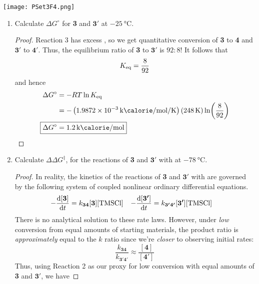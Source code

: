 \documentclass[../psets.tex]{subfiles}
\begin{document}
\begin{enumerate}
    \begin{center}
        \texttt{[image: PSet3F4.png]}
    \end{center}
    \begin{enumerate}
        \item Calculate $\Delta G^\circ$ for \textbf{3} and $\bm{3'}$ at $-\SI{25}{\celsius}$.
        \begin{proof}
            Reaction 3 has excess , so we get quantitative conversion of \textbf{3} to \textbf{4} and $\bm{3'}$ to $\bm{4'}$. Thus, the equilibrium ratio of \textbf{3} to $\bm{3'}$ is $92:8$! It follows that
            \begin{equation*}
                K_\textup{eq} = \frac{8}{92}
            \end{equation*}
            and hence
            \begin{align*}
                \Delta G^\circ &= -RT\ln\Keq\\
                &= -\left( \SI[per-mode=fraction]{1.9872e-3}{\kilo\calorie\per\mole\per\kelvin} \right)\left( \SI{248}{\kelvin} \right)\ln(\frac{8}{92})\\
                \Aboxed{\Delta G^\circ &= \kcal{1.2}}
            \end{align*}
        \end{proof}
        \item Calculate $\Delta\Delta G^\ddagger$, for the reactions of \textbf{3} and $\bm{3'}$ with  at $-\SI{78}{\celsius}$.
        \begin{proof}
            In reality, the kinetics of the reactions of \textbf{3} and $\bm{3'}$ with  are governed by the following system of coupled nonlinear ordinary differential equations.
            \begin{align*}
                -\dv{[\bm{3}]}{t}  &= k_{\bm{34}}[\bm{3}]\cnc{TMSCl}&
                -\dv{[\bm{3'}]}{t} &= k_{\bm{3'4'}}[\bm{3'}]\cnc{TMSCl}
            \end{align*}
            There is no analytical solution to these rate laws. However, under \emph{low} conversion from equal amounts of starting materials, the product ratio is \emph{approximately} equal to the $k$ ratio since we're \emph{closer} to observing initial rates:
            \begin{equation*}
                \frac{k_{\bm{34}}}{k_{\bm{3'4'}}} \approx \frac{[\bm{4}]}{[\bm{4'}]}
            \end{equation*}
            Thus, using Reaction 2 as our proxy for low conversion with equal amounts of \textbf{3} and $\bm{3'}$, we have

\end{proof}
\end{enumerate}
\end{enumerate}
\end{document}
